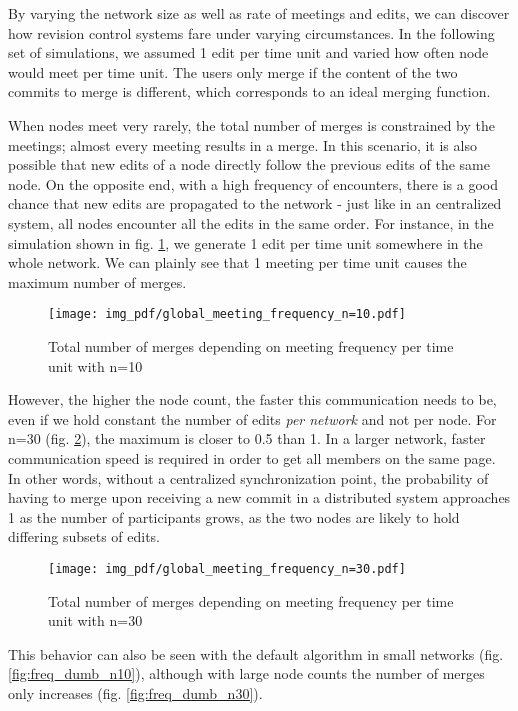 \documentclass[conference,letterpaper]{IEEEtran}
\begin{document}
By varying the network size as well as rate of meetings and edits, we can discover how revision control systems fare under varying circumstances. In the following set of simulations, we assumed 1 edit per time unit and varied how often node would meet per time unit. The users only merge if the content of the two commits to merge is different, which corresponds to an ideal merging function.

When nodes meet very rarely, the total number of merges is constrained by the meetings; almost every meeting results in a merge. In this scenario, it is also possible that new edits of a node directly follow the previous edits of the same node. On the opposite end, with a high frequency of encounters, there is a good chance that new edits are propagated to the network - just like in an centralized system, all nodes encounter all the edits in the same order. For instance, in the simulation shown in fig. \ref{fig:freq_n10}, we generate 1 edit per time unit somewhere in the whole network. We can plainly see that 1 meeting per time unit causes the maximum number of merges.

\begin{figure}
  \texttt{[image: img\_pdf/global\_meeting\_frequency\_n=10.pdf]}
  \caption{Total number of merges depending on meeting frequency per time unit with n=10}
  \label{fig:freq_n10}
\end{figure}

However, the higher the node count, the faster this communication needs to be, even if we hold constant the number of edits \textit{per network} and not per node. For n=30 (fig. \ref{fig:freq_n30}), the maximum is closer to 0.5 than 1. In a larger network, faster communication speed is required in order to get all members on the same page. In other words, without a centralized synchronization point, the probability of having to merge upon receiving a new commit in a distributed system approaches 1 as the number of participants grows, as the two nodes are likely to hold differing subsets of edits.
\begin{figure}
  \texttt{[image: img\_pdf/global\_meeting\_frequency\_n=30.pdf]}
  \caption{Total number of merges depending on meeting frequency per time unit with n=30}
  \label{fig:freq_n30}
\end{figure}

This behavior can also be seen with the default algorithm in small networks (fig. \ref{fig:freq_dumb_n10}), although with large node counts the number of merges only increases (fig. \ref{fig:freq_dumb_n30}).
\end{document}
